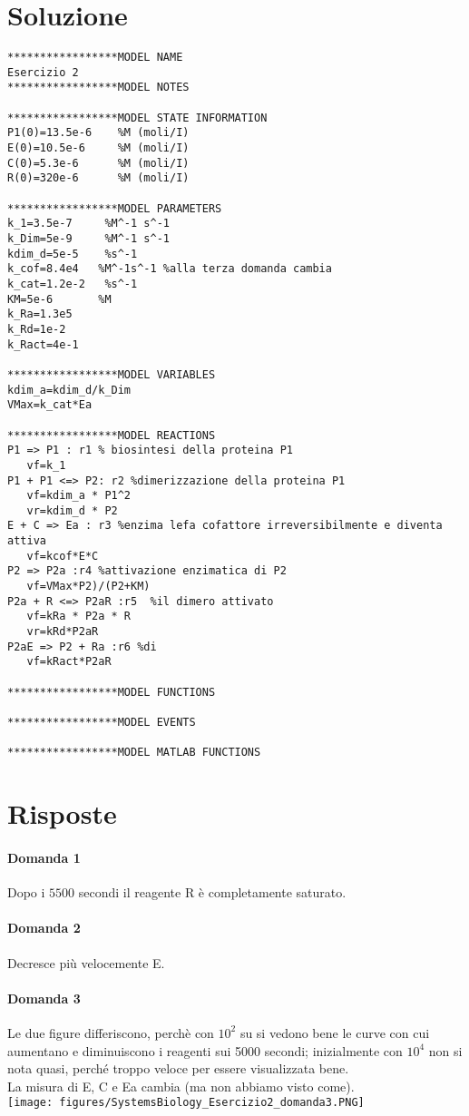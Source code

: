 \documentclass{article}
\begin{document}
\section*{Soluzione}
\begin{verbatim}
*****************MODEL NAME
Esercizio 2
*****************MODEL NOTES

*****************MODEL STATE INFORMATION
P1(0)=13.5e-6    %M (moli/I)
E(0)=10.5e-6     %M (moli/I)
C(0)=5.3e-6      %M (moli/I)
R(0)=320e-6      %M (moli/I)

*****************MODEL PARAMETERS
k_1=3.5e-7     %M^-1 s^-1
k_Dim=5e-9     %M^-1 s^-1
kdim_d=5e-5    %s^-1
k_cof=8.4e4   %M^-1s^-1 %alla terza domanda cambia 
k_cat=1.2e-2   %s^-1
KM=5e-6       %M
k_Ra=1.3e5
k_Rd=1e-2
k_Ract=4e-1

*****************MODEL VARIABLES
kdim_a=kdim_d/k_Dim
VMax=k_cat*Ea

*****************MODEL REACTIONS
P1 => P1 : r1 % biosintesi della proteina P1
   vf=k_1
P1 + P1 <=> P2: r2 %dimerizzazione della proteina P1
   vf=kdim_a * P1^2
   vr=kdim_d * P2
E + C => Ea : r3 %enzima lefa cofattore irreversibilmente e diventa attiva
   vf=kcof*E*C
P2 => P2a :r4 %attivazione enzimatica di P2 
   vf=VMax*P2)/(P2+KM)
P2a + R <=> P2aR :r5  %il dimero attivato 
   vf=kRa * P2a * R
   vr=kRd*P2aR
P2aE => P2 + Ra :r6 %di
   vf=kRact*P2aR

*****************MODEL FUNCTIONS

*****************MODEL EVENTS

*****************MODEL MATLAB FUNCTIONS
\end{verbatim}

\section*{Risposte}
\paragraph{Domanda 1}
Dopo i $5500$ secondi il reagente R è completamente saturato.
\paragraph{Domanda 2}
Decresce più velocemente E.
\paragraph{Domanda 3}
Le due figure differiscono, perchè con $10^2$ su si vedono bene le curve con cui aumentano e diminuiscono i reagenti sui 5000 secondi; 
inizialmente con $10^4$ non si nota quasi, perché troppo veloce per essere visualizzata bene.\\
La misura di E, C e Ea cambia (ma non abbiamo visto come).\\
\texttt{[image: figures/SystemsBiology\_Esercizio2\_domanda3.PNG]}
\end{document}

